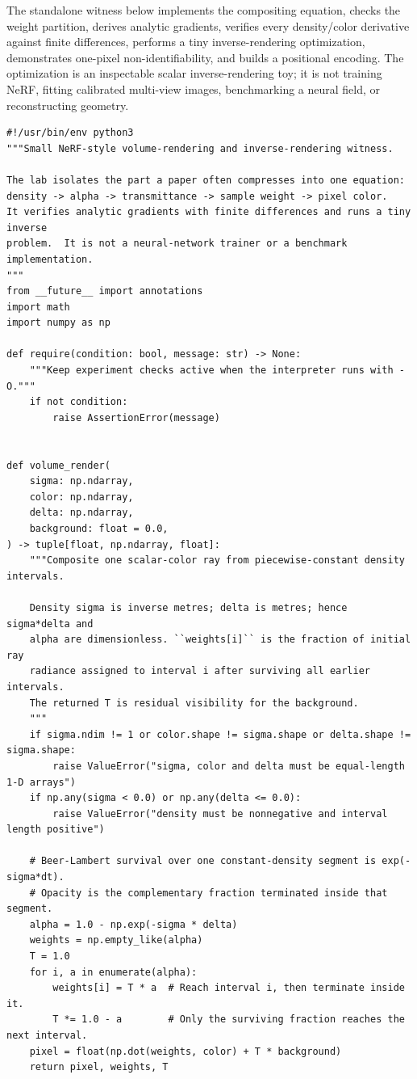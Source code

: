 The standalone witness below implements the compositing equation, checks the weight partition, derives analytic gradients, verifies every density/color derivative against finite differences, performs a tiny inverse-rendering optimization, demonstrates one-pixel non-identifiability, and builds a positional encoding. The optimization is an inspectable scalar inverse-rendering toy; it is not training NeRF, fitting calibrated multi-view images, benchmarking a neural field, or reconstructing geometry.

\begin{verbatim}
#!/usr/bin/env python3
"""Small NeRF-style volume-rendering and inverse-rendering witness.

The lab isolates the part a paper often compresses into one equation:
density -> alpha -> transmittance -> sample weight -> pixel color.
It verifies analytic gradients with finite differences and runs a tiny inverse
problem.  It is not a neural-network trainer or a benchmark implementation.
"""
from __future__ import annotations
import math
import numpy as np

def require(condition: bool, message: str) -> None:
    """Keep experiment checks active when the interpreter runs with -O."""
    if not condition:
        raise AssertionError(message)


def volume_render(
    sigma: np.ndarray,
    color: np.ndarray,
    delta: np.ndarray,
    background: float = 0.0,
) -> tuple[float, np.ndarray, float]:
    """Composite one scalar-color ray from piecewise-constant density intervals.

    Density sigma is inverse metres; delta is metres; hence sigma*delta and
    alpha are dimensionless. ``weights[i]`` is the fraction of initial ray
    radiance assigned to interval i after surviving all earlier intervals.
    The returned T is residual visibility for the background.
    """
    if sigma.ndim != 1 or color.shape != sigma.shape or delta.shape != sigma.shape:
        raise ValueError("sigma, color and delta must be equal-length 1-D arrays")
    if np.any(sigma < 0.0) or np.any(delta <= 0.0):
        raise ValueError("density must be nonnegative and interval length positive")

    # Beer-Lambert survival over one constant-density segment is exp(-sigma*dt).
    # Opacity is the complementary fraction terminated inside that segment.
    alpha = 1.0 - np.exp(-sigma * delta)
    weights = np.empty_like(alpha)
    T = 1.0
    for i, a in enumerate(alpha):
        weights[i] = T * a  # Reach interval i, then terminate inside it.
        T *= 1.0 - a        # Only the surviving fraction reaches the next interval.
    pixel = float(np.dot(weights, color) + T * background)
    return pixel, weights, T



\end{verbatim}
